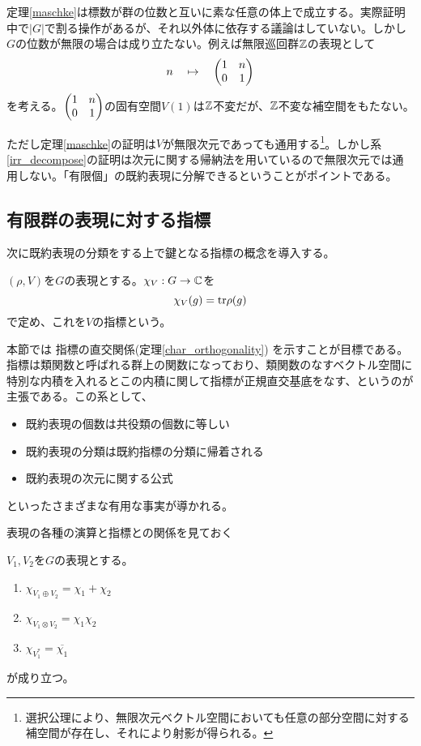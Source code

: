 \documentclass{ltjsreport}
\begin{document}
\begin{notice}
  定理\ref{maschke}は標数が群の位数と互いに素な任意の体上で成立する。実際証明中で$|G|$で割る操作があるが、それ以外体に依存する議論はしていない。しかし$G$の位数が無限の場合は成り立たない。例えば無限巡回群$\mathbb{Z}$の表現として
  \[
  n\quad\mapsto\quad\begin{pmatrix} 1 & n\\0 & 1 \end{pmatrix}
  \]
  を考える。$\begin{pmatrix} 1 & n\\0 & 1 \end{pmatrix}$の固有空間$V(1)$は$\mathbb{Z}$不変だが、$\mathbb{Z}$不変な補空間をもたない。
  
  ただし定理\ref{maschke}の証明は$V$が無限次元であっても通用する\footnote{
    選択公理により、無限次元ベクトル空間においても任意の部分空間に対する補空間が存在し、それにより射影が得られる。
  }。しかし系\ref{irr_decompose}の証明は次元に関する帰納法を用いているので無限次元では通用しない。「有限個」の既約表現に分解できるということがポイントである。
  
\end{notice}





\subsection{有限群の表現に対する指標}

次に既約表現の分類をする上で鍵となる指標の概念を導入する。

\begin{defin}
  $(\rho,V)$を$G$の表現とする。$\chi_V:G\rightarrow\mathbb{C}$を
  \[
  \chi_V(g)=\text{tr} \rho(g)
  \]
  で定め、これを$V$の指標という。
\end{defin}

本節では
指標の直交関係(定理\ref{char_orthogonality})
を示すことが目標である。指標は類関数と呼ばれる群上の関数になっており、類関数のなすベクトル空間に特別な内積を入れるとこの内積に関して指標が正規直交基底をなす、というのが主張である。この系として、
\begin{itemize}
  \item 既約表現の個数は共役類の個数に等しい
  \item 既約表現の分類は既約指標の分類に帰着される
  \item 既約表現の次元に関する公式
\end{itemize}
といったさまざまな有用な事実が導かれる。

表現の各種の演算と指標との関係を見ておく

\begin{prop}\label{char_property}
  $V_1,V_2$を$G$の表現とする。
  \begin{enumerate}
    \item $\chi_{V_1\oplus V_2}=\chi_1+\chi_2$
    \item $\chi_{V_1\otimes V_2}=\chi_1\chi_2$
    \item $\chi_{V_1^*}=\overline{\chi_1}$
  \end{enumerate}
  が成り立つ。
\end{prop}
\end{document}
